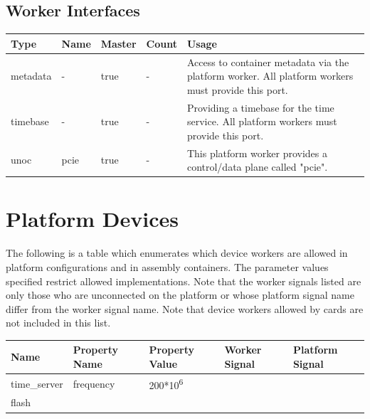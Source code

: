 \documentclass{article}
\begin{document}
\begin{landscape}
	\section*{Worker Interfaces}
	\begin{scriptsize}
		\begin{tabular}{|M{2cm}|M{2cm}|M{1.5cm}|M{1.5cm}|M{14.5cm}|}
			\hline
			Type       & Name & Master & Count & Usage                  \\
			\hline
			metadata   & -    & true   & -     & Access to container metadata via the platform worker. All platform workers must provide this port. \\
			\hline
			timebase   & -    & true   & -     & Providing a timebase for the time service. All platform workers must provide this port. \\
			\hline
			unoc       & pcie & true   & -     & This platform worker provides a control/data plane called "pcie". \\
			\hline
		\end{tabular}
	\end{scriptsize}

\end{landscape}
\pagebreak
	\section*{Platform Devices}
	The following is a table which enumerates which device workers are allowed in platform configurations and in assembly containers. The parameter values specified restrict allowed implementations. Note that the worker signals listed are only those who are unconnected on the platform or whose platform signal name differ from the worker signal name. Note that device workers allowed by cards are not included in this list.\\
			\begin{tabular}{|M{3cm}|M{3.5cm}|M{3cm}|M{3cm}|M{3cm}|}
			\hline
			Name                       & Property Name    & Property Value              & Worker Signal & Platform Signal         \\
			\hline
			time\_server               & frequency        & 200*10\textsuperscript{6}   &               &                         \\
			\hline
			flash &   &   &  &  \\
			\hline
		\end{tabular}
\end{document}

